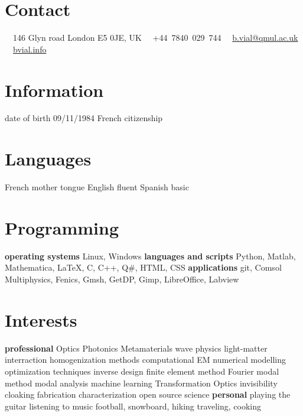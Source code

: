 \documentclass{cv}
\begin{document}


\begin{aside} %
	\section{Contact}
	\faHome~~146 Glyn road
	London E5 0JE, UK
	\faPhone~~+44~7840~029~744
	\faEnvelope~~\href{mailto:b.vial@qmul.ac.uk}{b.vial@qmul.ac.uk}
	\faUser~~\href{http://bvial.info/}{bvial.info}
	\section{Information}
	date of birth 09/11/1984
	French citizenship
	\section{Languages}
	French mother tongue
	English fluent
	Spanish basic
	\section{Programming}
	\textbf{operating systems}
	Linux, Windows
	\textbf{languages and scripts}
	Python, Matlab, Mathematica, \LaTeX, C, C++, Q\#, HTML, CSS
	\textbf{applications}
	git, Comsol Multiphysics, Fenics, Gmsh, GetDP, Gimp, LibreOffice, Labview
	\section{Interests}
	\textbf{professional}
	Optics
	Photonics
	Metamaterials
	wave physics
	light-matter interraction
	homogenization methods
	computational EM
	numerical modelling
	optimization techniques
	inverse design
	finite element method
	Fourier modal method
	modal analysis
	machine learning
	Transformation Optics
	invisibility cloaking
	fabrication
	characterization
	open source science
	\textbf{personal}
	playing the guitar
	listening to music
	football, snowboard, hiking
	traveling, cooking
\end{aside}


\end{document}
